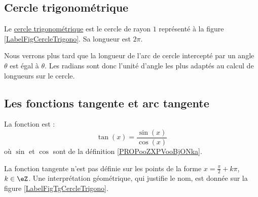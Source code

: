 \subsection{Cercle trigonométrique}

Le \href{http://fr.wikiversity.org/wiki/Trigonométrie/Cosinus_et_sinus_dans_le_cercle_trigonométrique}{cercle trigonométrique} est le cercle de rayon $1$ représenté à la figure \ref{LabelFigCercleTrigono}. Sa longueur est $2\pi$.
\newcommand{\CaptionFigCercleTrigono}{Le cercle trigonométrique.}


Nous verrons plus tard que la longueur de l'arc de cercle intercepté par un angle $\theta$ est égal à $\theta$. Les radians sont donc l'unité d'angle les plus adaptés au calcul de longueurs sur le cercle. 



\subsection{Les fonctions tangente et arc tangente}

\begin{definition}
    La fonction  est :
    \begin{equation}
        \tan(x)=\frac{ \sin(x) }{ \cos(x) }
    \end{equation}
    où \( \sin\) et \( \cos\) sont de la définition \ref{PROPooZXPVooBjONka}.
\end{definition}
La fonction tangente n'est pas définie sur les points de la forme \( x=\frac{ \pi }{2}+k\pi\), \( k\in \eZ\). Une interprétation géométrique, qui justifie le nom, est donnée sur la figure \ref{LabelFigTgCercleTrigono}.
\newcommand{\CaptionFigTgCercleTrigono}{Interprétation géométrique de la fonction tangente. La tangente de l'angle $\theta$ est positive (et un peu plus grande que $1$) tandis que celle de la tangente de l'angle $\varphi$ est négative.}


